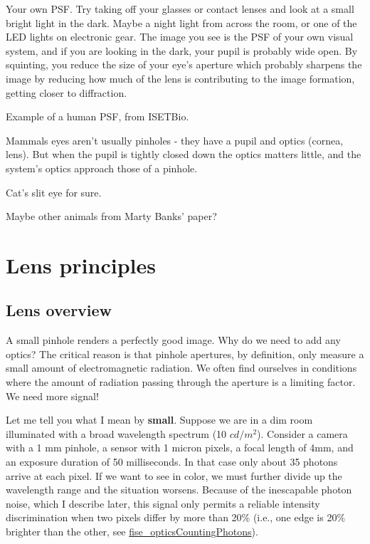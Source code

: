 \documentclass[
  letterpaper,
]{book}
\begin{document}
Your own PSF. Try taking off your glasses or contact lenses and look at
a small bright light in the dark. Maybe a night light from across the
room, or one of the LED lights on electronic gear. The image you see is
the PSF of your own visual system, and if you are looking in the dark,
your pupil is probably wide open. By squinting, you reduce the size of
your eye's aperture which probably sharpens the image by reducing how
much of the lens is contributing to the image formation, getting closer
to diffraction.

Example of a human PSF, from ISETBio.

\begin{tcolorbox}[enhanced jigsaw, opacitybacktitle=0.6, breakable, bottomtitle=1mm, leftrule=.75mm, colframe=quarto-callout-note-color-frame, colback=white, left=2mm, opacityback=0, title=\textcolor{quarto-callout-note-color}{\faInfo}\hspace{0.5em}{Animal pupil shapes.}, toptitle=1mm, bottomrule=.15mm, titlerule=0mm, arc=.35mm, colbacktitle=quarto-callout-note-color!10!white, toprule=.15mm, rightrule=.15mm, coltitle=black]

Mammals eyes aren't usually pinholes - they have a pupil and optics
(cornea, lens). But when the pupil is tightly closed down the optics
matters little, and the system's optics approach those of a pinhole.

Cat's slit eye for sure.

Maybe other animals from Marty Banks' paper?

\end{tcolorbox}

\chapter{Lens principles}\label{sec-optics-lenses}

\section{Lens overview}\label{lens-overview}

A small pinhole renders a perfectly good image. Why do we need to add
any optics? The critical reason is that pinhole apertures, by
definition, only measure a small amount of electromagnetic radiation. We
often find ourselves in conditions where the amount of radiation passing
through the aperture is a limiting factor. We need more signal!

Let me tell you what I mean by \textbf{small}. Suppose we are in a dim
room illuminated with a broad wavelength spectrum (10 \(cd/m^2\)).
Consider a camera with a 1 mm pinhole, a sensor with 1 micron pixels, a
focal length of 4mm, and an exposure duration of 50 milliseconds. In
that case only about 35 photons arrive at each pixel. If we want to see
in color, we must further divide up the wavelength range and the
situation worsens. Because of the inescapable photon noise, which I
describe later, this signal only permits a reliable intensity
discrimination when two pixels differ by more than 20\% (i.e., one edge
is 20\% brighter than the other, see
\href{../code/fise_opticsCountingPhotons.html}{fise\_opticsCountingPhotons}).
\end{document}
